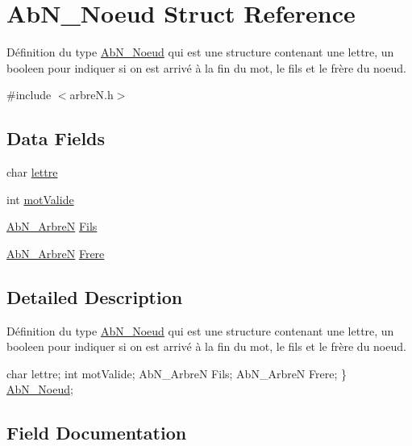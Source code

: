 \hypertarget{struct_ab_n___noeud}{}\section{Ab\+N\+\_\+\+Noeud Struct Reference}
\label{struct_ab_n___noeud}


Définition du type \hyperlink{struct_ab_n___noeud}{Ab\+N\+\_\+\+Noeud} qui est une structure contenant une lettre, un booleen pour indiquer si on est arrivé à la fin du mot, le fils et le frère du noeud.  




{\ttfamily \#include $<$arbre\+N.\+h$>$}

\subsection*{Data Fields}
\begin{DoxyCompactItemize}
\item 
char \hyperlink{struct_ab_n___noeud_a1fd1cee5d78e1f4af4a8fe512320ef95}{lettre}
\item 
int \hyperlink{struct_ab_n___noeud_a633ebb76d03647ae3e74e6206bae1ca5}{mot\+Valide}
\item 
\hyperlink{arbre_n_8h_add8f6e03bc4360adaf4735b01c864d18}{Ab\+N\+\_\+\+ArbreN} \hyperlink{struct_ab_n___noeud_afd9b44dfec214f300db6daab2843f010}{Fils}
\item 
\hyperlink{arbre_n_8h_add8f6e03bc4360adaf4735b01c864d18}{Ab\+N\+\_\+\+ArbreN} \hyperlink{struct_ab_n___noeud_ab9f6c9e522d1192a2530d3fff9baa102}{Frere}
\end{DoxyCompactItemize}


\subsection{Detailed Description}
Définition du type \hyperlink{struct_ab_n___noeud}{Ab\+N\+\_\+\+Noeud} qui est une structure contenant une lettre, un booleen pour indiquer si on est arrivé à la fin du mot, le fils et le frère du noeud. 

char lettre; int mot\+Valide; Ab\+N\+\_\+\+ArbreN Fils; Ab\+N\+\_\+\+ArbreN Frere; \} \hyperlink{struct_ab_n___noeud}{Ab\+N\+\_\+\+Noeud}; 

\subsection{Field Documentation}
\mbox{\label{struct_ab_n___noeud_afd9b44dfec214f300db6daab2843f010}} 
